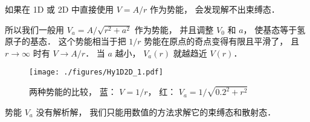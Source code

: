 
如果在 1D 或 2D 中直接使用 $V = A/r$ 作为势能， 会发现解不出束缚态．

所以我们一般用 $V_a = A/\sqrt{r^2 + a^2}$ 作为势能， 并且调整 $V_0$ 和 $a$， 使基态等于氢原子的基态． 这个势能相当于把 $1/r$ 势能在原点的奇点变得有限且平滑了， 且 $r\to\infty$ 时有 $V \to A/r$． 当 $a$ 越小， $V_a(r)$ 就越趋近 $V(r)$．

\begin{figure}[ht]
\centering
\texttt{[image: ./figures/Hy1D2D\_1.pdf]}
\caption{两种势能的比较， 蓝： $V = 1/r$， 红： $V_a = 1/\sqrt{0.2^2 + r^2}$} \label{Hy1D2D_fig1}
\end{figure}

势能 $V_a$ 没有解析解， 我们只能用数值的方法求解它的束缚态和散射态．
